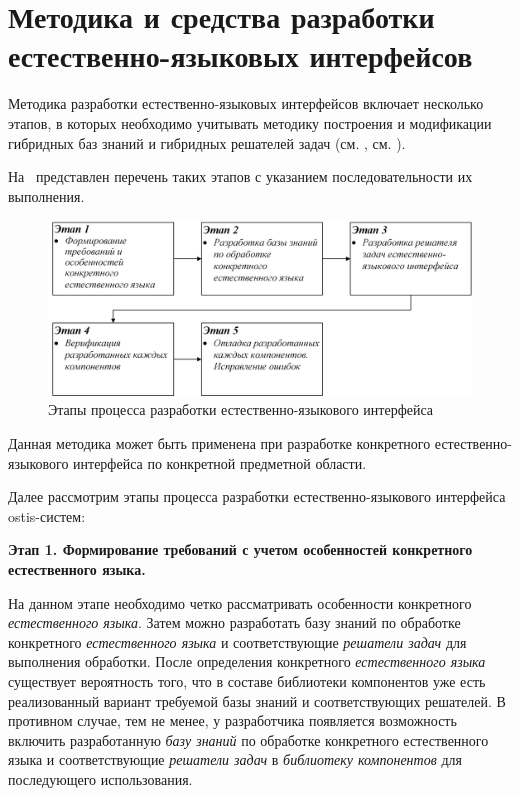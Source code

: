 \section{Методика и средства разработки естественно-языковых интерфейсов}
\label{section_natural_language_interface_development_methods}

Методика разработки естественно-языковых интерфейсов включает несколько этапов, в которых необходимо учитывать методику построения и модификации гибридных баз знаний и гибридных решателей задач (см. , см. ).

\newpage

На~\textit{} представлен перечень таких этапов с указанием последовательности их выполнения.

\begin{figure}[H]
	\centering
	\includegraphics[scale=0.8,width=1.0\textwidth]{images/part4/chapter_chinese/method}
	\caption{Этапы процесса разработки естественно-языкового интерфейса}
	\label{fig:method-interface}
\end{figure}

Данная методика может быть применена при разработке конкретного естественно-языкового интерфейса по конкретной предметной области.

Далее рассмотрим этапы процесса разработки естественно-языкового интерфейса ostis-систем:

\textbf{Этап 1. Формирование требований с учетом особенностей конкретного естественного языка.}

На данном этапе необходимо четко рассматривать особенности конкретного \textit{естественного языка}.
Затем можно разработать базу знаний по обработке конкретного \textit{естественного языка} и соответствующие \textit{решатели задач} для выполнения обработки.
После определения конкретного \textit{естественного языка} существует вероятность того, что в составе библиотеки компонентов уже есть реализованный вариант требуемой базы знаний и соответствующих решателей.
В противном случае, тем не менее, у разработчика появляется возможность включить разработанную \textit{базу знаний} по обработке конкретного естественного языка и соответствующие \textit{решатели задач} в \textit{библиотеку компонентов} для последующего использования.

